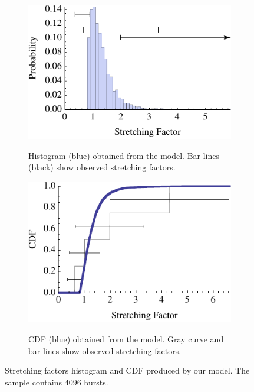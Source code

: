 \documentclass{article}
\begin{document}
\begin{figure}
	\hspace*{\fill}
	\begin{subfigure}{0.45\textwidth}
		\includegraphics[width=\textwidth]{kappaDistributionHistogram}
		\label{fig:kappaDistributionHistogram}
		\caption{Histogram (blue) obtained from the model. Bar lines (black) show observed stretching factors.}
	\end{subfigure}
	\hfill
	\begin{subfigure}{0.45\textwidth}
		\includegraphics[width=\textwidth]{kappaDistributionCDF}
		\label{fig:kappaDistributionCDF}
		\caption{CDF (blue) obtained from the model. Gray curve and bar lines show observed stretching factors.}
	\end{subfigure}
	\hspace*{\fill}
	\caption{Stretching factors histogram and CDF produced by our model. The sample contains $4096$ bursts.}
	\label{fig:kappaDistribution}
\end{figure}
\end{document}
